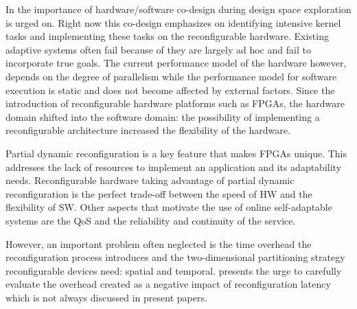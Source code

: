 
In \cite{reconfigurable} the importance of hardware/software co-design during design space exploration is urged on. 
Right now this co-design emphasizes on identifying intensive kernel tasks and implementing these tasks on the reconfigurable hardware. 
Existing adaptive systems often fail because of they are largely ad hoc and fail to incorporate true goals.
The current performance model of the hardware however, depends on the degree of parallelism while the performance model for software execution is static and does not become affected by external factors. 
Since the introduction of reconfigurable hardware platforms such as FPGAs, the hardware domain shifted into the software domain: the possibility of implementing a reconfigurable architecture increased the flexibility of the hardware.

Partial dynamic reconfiguration is a key feature that makes FPGAs unique. 
This addresses the lack of resources to implement an application and its adaptability needs. Reconfigurable hardware taking advantage of partial dynamic reconfiguration is the perfect trade-off between the speed of HW and the flexibility of SW. Other aspects that motivate the use of online self-adaptable systems are the QoS and the reliability and continuity of the service.

However, an important problem often neglected is the time overhead the reconfiguration process introduces and the two-dimensional partitioning strategy reconfigurable devices need: spatial and temporal. 
\cite{reconfigurable} presents the urge to carefully evaluate the overhead created as a negative impact of reconfiguration latency which is not always discussed in present papers. 